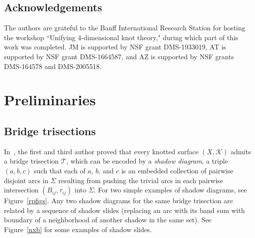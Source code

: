 \documentclass[11pt, oneside]{amsart}
\theoremstyle{theorem}
\theoremstyle{definition}
\newcommand{\Kk}{\mathcal K}
\newcommand{\A}{\alpha}
\newcommand{\n}{\beta}
\newcommand{\g}{\gamma}
\newcommand{\X}{\times}
\newcommand{\T}{\mathcal{T}}
\theoremstyle{theorem}
\begin{document}
\subsection*{Acknowledgements}

The authors are grateful to the Banff International Research Station for hosting the workshop ``Unifying 4-dimensional knot theory," during which part of this work was completed.  JM is supported by NSF grant DMS-1933019, AT is supported by NSF grant DMS-1664587, and AZ is supported by NSF grants DMS-164578 and DMS-2005518. 

\section{Preliminaries}\label{prelim}



\subsection{Bridge trisections}


In~\cite{MZB1}, the first and third author proved that every knotted surface $(X,\Kk)$ admits a bridge trisection $\T$, which can be encoded by a \emph{shadow diagram}, a triple $(a,b,c)$ such that each of $a$, $b$, and $c$ is an embedded collection of pairwise disjoint arcs in $\Sigma$ resulting from pushing the trivial arcs in each pairwise intersection $(B_{ij},\tau_{ij})$ into $\Sigma$. For two simple examples of shadow diagrams, see Figure~\ref{rpfigs}.
 Any two shadow diagrams for the same bridge trisection are related by a sequence of shadow slides (replacing an arc with its band sum with boundary of a neighborhood of another shadow in the same set).
See Figure~\ref{nxb} for some examples of shadow slides.
\end{document}

